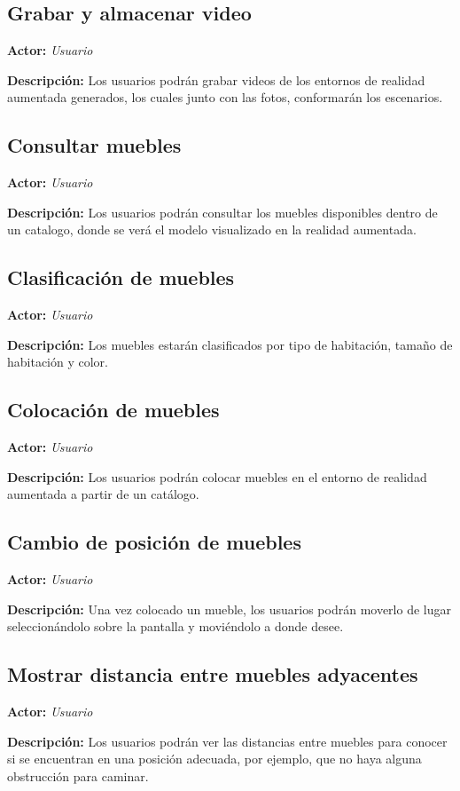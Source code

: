 \subsection{Grabar y almacenar video}
\textbf{Actor:} \textit{Usuario} \par
\textbf{Descripción:} Los usuarios podrán grabar videos de los entornos de realidad aumentada generados, los cuales junto con las fotos, conformarán los escenarios.


\subsection{Consultar muebles}
\textbf{Actor:} \textit{Usuario} \par
\textbf{Descripción:} Los usuarios podrán consultar los muebles disponibles dentro de un catalogo, donde se verá el modelo visualizado en la realidad aumentada.

\subsection{Clasificación de muebles}
\textbf{Actor:} \textit{Usuario} \par
\textbf{Descripción:} Los muebles estarán clasificados por tipo de habitación, tamaño de habitación y color.

\subsection{Colocación de muebles}
\textbf{Actor:} \textit{Usuario} \par
\textbf{Descripción:}  Los usuarios podrán colocar muebles en el entorno de realidad aumentada a partir de un catálogo.

\subsection{Cambio de posición de muebles}
\textbf{Actor:} \textit{Usuario} \par
\textbf{Descripción:}  Una vez colocado un mueble, los usuarios podrán moverlo de lugar seleccionándolo sobre la pantalla y moviéndolo a donde desee.

\subsection{Mostrar distancia entre muebles adyacentes}
\textbf{Actor:} \textit{Usuario} \par
\textbf{Descripción:}  Los usuarios podrán ver las distancias entre muebles para conocer si se encuentran en una posición adecuada, por ejemplo, que no haya alguna obstrucción para caminar.

